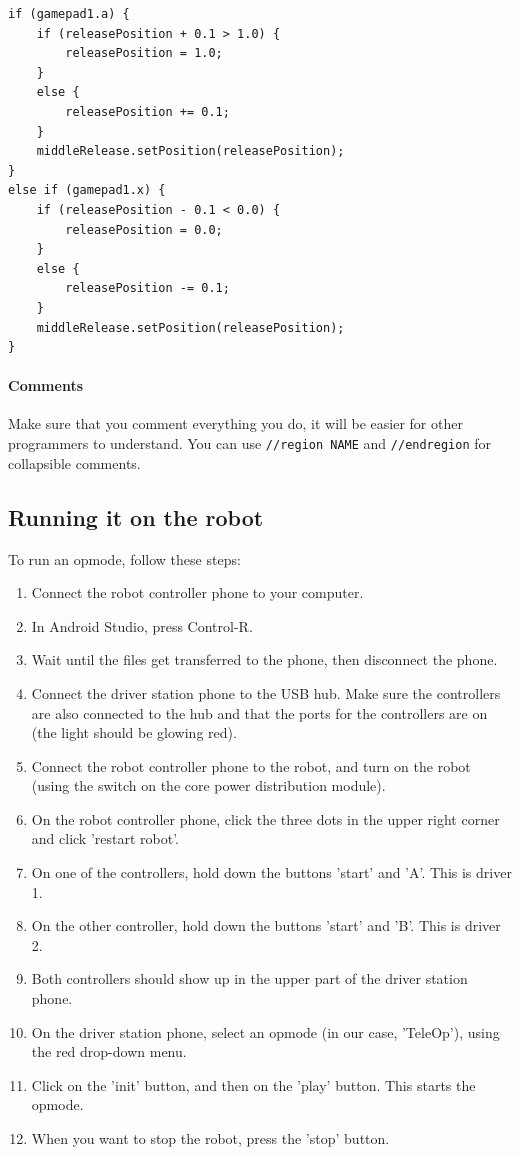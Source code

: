 \documentclass[12p,a4paper]{article}
\begin{document}
\begin{verbatim}
if (gamepad1.a) {
	if (releasePosition + 0.1 > 1.0) {
		releasePosition = 1.0;
	} 
	else {
		releasePosition += 0.1;
	}
	middleRelease.setPosition(releasePosition);
} 
else if (gamepad1.x) {
	if (releasePosition - 0.1 < 0.0) {
		releasePosition = 0.0;
	} 
	else {
		releasePosition -= 0.1;
	}
	middleRelease.setPosition(releasePosition);
}
\end{verbatim}

\paragraph{Comments} Make sure that you comment everything you do, it will be easier for other programmers to understand. You can use \verb!//region NAME! and \verb!//endregion! for collapsible comments.

\subsection{Running it on the robot}
To run an opmode, follow these steps:
\begin{enumerate}
\item{Connect the robot controller phone to your computer.}
\item{In Android Studio, press Control-R.}
\item{Wait until the files get transferred to the phone, then disconnect the phone.}
\item{Connect the driver station phone to the USB hub. Make sure the controllers are also connected to the hub and that the ports for the controllers are on (the light should be glowing red).}
\item{Connect the robot controller phone to the robot, and turn on the robot (using the switch on the core power distribution module).}
\item{On the robot controller phone, click the three dots in the upper right corner and click 'restart robot'.}
\item{On one of the controllers, hold down the buttons 'start' and 'A'. This is driver 1.}
\item{On the other controller, hold down the buttons 'start' and 'B'. This is driver 2.}
\item{Both controllers should show up in the upper part of the driver station phone.}
\item{On the driver station phone, select an opmode (in our case, 'TeleOp'), using the red drop-down menu.}
\item{Click on the 'init' button, and then on the 'play' button. This starts the opmode.}
\item{When you want to stop the robot, press the 'stop' button.}
\end{enumerate}
\end{document}
